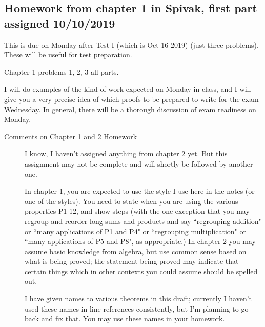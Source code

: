 \documentclass[12pt]{article}
\begin{document}
\newpage

\subsection{Homework from chapter 1 in Spivak, first part assigned 10/10/2019}

This is due on Monday after Test I (which is Oct 16 2019) (just three problems).  These will be useful for test preparation.

Chapter 1  problems 1, 2, 3 all parts.

I will do examples of the kind of work expected on Monday in class, and I will give you a very precise idea of which proofs to be prepared to write for the exam Wednesday.  In general, there will be a thorough discussion of exam readiness on Monday.






\begin{description}

\item[Comments on Chapter 1 and 2 Homework]  

I know, I haven't assigned anything from chapter 2 yet.   But this assignment may not be complete and will shortly be followed by another one.

In chapter 1, you are expected to use the style I use here in the notes (or one of the styles).  You need to state when you are using the various properties P1-12, and show steps (with the one exception
that you may regroup and reorder long sums and products and say ``regrouping addition" or ``many applications of P1 and P4" or ``regrouping multiplication" or ``many applications of P5 and P8", as appropriate.) In chapter 2 you may assume
basic knowledge from algebra, but use common sense based on what is being proved; the statement being proved may indicate that certain things which in other contexts you could assume should be spelled out.

I have given names to various theorems in this draft; currently I haven't used these names in line references consistently, but I'm planning to go back and fix that.  You may use these names in your homework.

\end{description}
\end{document}
